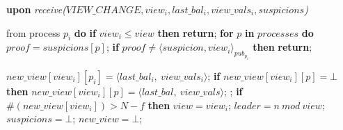 \begin{algorithm}
\begin{algorithmic}[1]
		\State\textbf{upon} \textit{receive($VIEW\_CHANGE, view_i, last\_bal_i, view\_vals_i, suspicions$)} 
		\item[] from process $p_i$ \textbf{do} 
		\State \hspace{\algorithmicindent} \textbf{if} $view_i \leq view$ \textbf{then}
		\State \hspace{\algorithmicindent}\hspace{\algorithmicindent}\textbf{return};
		\State
		\State \hspace{\algorithmicindent} \textbf{for} $p$ \textbf{in} $processes$ \textbf{do} 
		\State \hspace{\algorithmicindent}\hspace{\algorithmicindent} $proof = suspicions[p]$;
		\State \hspace{\algorithmicindent}\hspace{\algorithmicindent} \textbf{if} $proof \neq \langle suspicion, view_i \rangle_{pub_{p_i}}$ \textbf{then}
		\State \hspace{\algorithmicindent}\hspace{\algorithmicindent}\hspace{\algorithmicindent} \textbf{return};
		
		\State
		\State\hspace{\algorithmicindent} $new\_view[view_i][p_i] = \langle last\_bal_i,\ view\_vals_i \rangle$;
		\State\hspace{\algorithmicindent} \textbf{if} $new\_view[view_i][p] = \bot$ \textbf{then}
		\State\hspace{\algorithmicindent}\hspace{\algorithmicindent} $new\_view[view_i][p] = \langle last\_bal,\ view\_vals \rangle$;
		\State\hspace{\algorithmicindent}\hspace{\algorithmicindent}  ;
		\State
		\State\hspace{\algorithmicindent} \textbf{if} $\#(new\_view[view_i]) > N-f$ \textbf{then}
		\State\hspace{\algorithmicindent}\hspace{\algorithmicindent} $view = view_i$;
		\State\hspace{\algorithmicindent}\hspace{\algorithmicindent} $leader = n\ mod\ view$;
		\State\hspace{\algorithmicindent}\hspace{\algorithmicindent} $suspicions = \bot$;
		\State\hspace{\algorithmicindent}\hspace{\algorithmicindent} $new\_view = \bot$;

	\end{algorithmic}
\end{algorithm}
